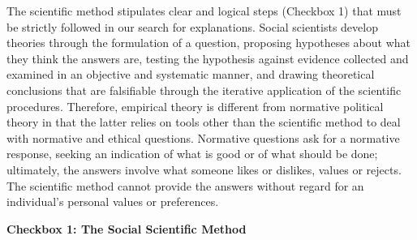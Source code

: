 \documentclass{book}
\begin{document}
The scientific method stipulates clear and logical steps (Checkbox 1) that
must be strictly followed in our search for explanations. Social scientists
develop theories through the formulation of a question, proposing hypotheses
about what they think the answers are, testing the hypothesis against evidence
collected and examined in an objective and systematic manner, and drawing
theoretical conclusions that are falsifiable through the iterative application
of the scientific procedures. Therefore, empirical theory is different from
normative political theory in that the latter relies on tools other than the
scientific method to deal with normative and ethical questions. Normative
questions ask for a normative response, seeking an indication of what is good
or of what should be done; ultimately, the answers involve what someone likes
or dislikes, values or rejects. The scientific method cannot provide the
answers without regard for an individual's personal values or preferences.

\textbf{Checkbox 1: The Social Scientific Method}
\end{document}
